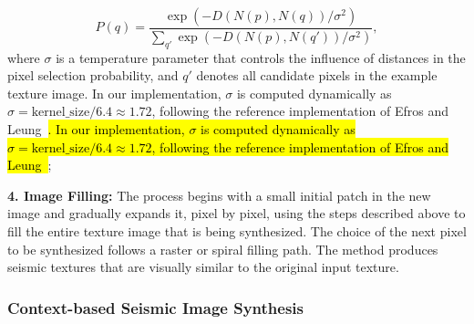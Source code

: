\documentclass{ieeeaccess}
\DeclareRobustCommand{\DIFaddbegin}{\DIFOaddbegin \let\includegraphics\DIFaddincludegraphics} %
\DeclareRobustCommand{\DIFaddend}{\DIFOaddend \let\includegraphics\DIFOincludegraphics} %
\providecommand{\DIFadd}[1]{{\protect\color{blue}#1}}
\renewcommand{\DIFadd}[1]{\ifmmode#1\else\begingroup\let\protect\relax\hl{#1}\endgroup\fi}
\providecommand{\DIFaddbegin}{}
\providecommand{\DIFaddend}{}
\renewcommand{\DIFaddbegin}{}
\renewcommand{\DIFaddend}{}
\begin{document}
\begin{equation}
P(q) = \frac{\exp(-D(N(p), N(q)) / \sigma^2)}{\sum_{q'} \exp(-D(N(p), N(q')) / \sigma^2)},
\end{equation}
where $\sigma$ is a temperature parameter that controls the influence of distances in the pixel selection probability, and $q'$ denotes all candidate pixels in the example texture image\DIFaddbegin \DIFadd{. In our implementation, $\sigma$ is computed dynamically as $\sigma = \text{kernel\_size} / 6.4 \approx 1.72$, following the reference implementation of Efros and Leung~\cite{Efros1999}}\DIFaddend ;

\textbf{4. Image Filling:} The process begins with a small initial patch in the new image and gradually expands it, pixel by pixel, using the steps described above to fill the entire texture image that is being synthesized. The choice of the next pixel to be synthesized follows a raster or spiral filling path. The method produces seismic textures that are visually similar to the original input texture. 

\subsubsection{Context-based Seismic Image Synthesis}
\end{document}
